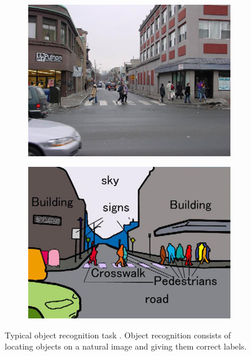\begin{figure}[htbp]
  \begin{subfigure}[b]{0.5\textwidth}
    \includegraphics[width=\textwidth]{gfx/object-recognition-1}
    \label{fig:sec:context:object-recognition-1}
  \end{subfigure}
  \hfill
  \begin{subfigure}[b]{0.5\textwidth}
    \includegraphics[width=\textwidth]{gfx/object-recognition-2}
    \label{fig:sec:context:object-recognition-2}
  \end{subfigure}
  \caption{
    Typical object recognition task \cite{Wolf}.
    Object recognition consists of locating objects on a natural image and giving them correct labels.
  }
  \label{fig:sec:context:object-recognition}
\end{figure}

